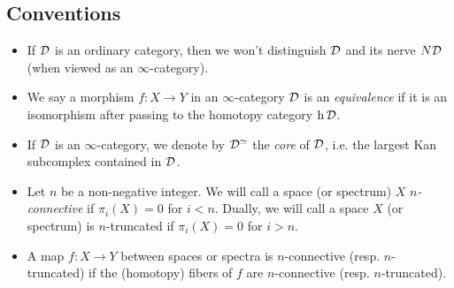 \subsection{Conventions}
\begin{itemize}
	\item If ${\mathcal{D}}$ is an ordinary category, then we won't distinguish ${\mathcal{D}}$ and its nerve $N{\mathcal{D}}$ (when viewed as an $\infty$-category).
	\item We say a morphism $f:X\rightarrow Y$ in an $\infty$-category ${\mathcal{D}}$ is an \emph{equivalence} if it is an isomorphism after passing to the homotopy category $\operatorname{h}{\mathcal{D}}$.
    \item If ${\mathcal{D}}$ is an $\infty$-category, we denote by ${\mathcal{D}}^{\simeq}$ the \emph{core} of ${\mathcal{D}}$, i.e. the largest Kan subcomplex contained in ${\mathcal{D}}$.  
    \item Let $n$ be a non-negative integer. 
    We will call a space (or spectrum) $X$ \emph{$n$-connective} if $\pi_i(X)=0$ for $i <n$. Dually, we will call a space $X$ (or spectrum) is $n$-truncated if $\pi_i(X)=0$ for $i >n$.
    \item A map $f: X \to Y$ between spaces or spectra is $n$-connective (resp. $n$-truncated) if the (homotopy) fibers of $f$ are $n$-connective (resp. $n$-truncated).
\end{itemize}

